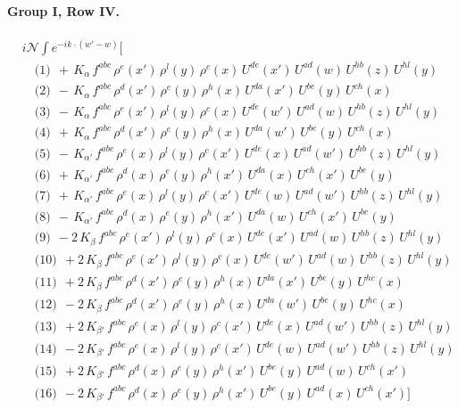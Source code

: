 \documentclass[10pt]{article}
\numberwithin{equation}{section}
\newcommand{\NN}{\mathcal N}
\begin{document}
\paragraph{Group I, Row IV.}
\begin{align*}
&i\NN\int e^{-ik\cdot(w'-w)}\Big[\\
&\quad\text{(1)}\ \ +\,K_{\alpha}\,f^{abc}\,\rho^{e}(x')\,\rho^{l}(y)\,\rho^{c}(x)\,U^{de}(x')\,U^{ad}(w)\,U^{hb}(z)\,U^{hl}(y)\\
&\quad\text{(2)}\ \ -\,K_{\alpha}\,f^{abc}\,\rho^{d}(x')\,\rho^{e}(y)\,\rho^{h}(x)\,U^{da}(x')\,U^{be}(y)\,U^{ch}(x)\\
&\quad\text{(3)}\ \ -\,K_{\alpha}\,f^{abc}\,\rho^{e}(x')\,\rho^{l}(y)\,\rho^{c}(x)\,U^{de}(w')\,U^{ad}(w)\,U^{hb}(z)\,U^{hl}(y)\\
&\quad\text{(4)}\ \ +\,K_{\alpha}\,f^{abc}\,\rho^{d}(x')\,\rho^{e}(y)\,\rho^{h}(x)\,U^{da}(w')\,U^{be}(y)\,U^{ch}(x)\\
&\quad\text{(5)}\ \ -\,K_{\alpha'}\,f^{abc}\,\rho^{e}(x)\,\rho^{l}(y)\,\rho^{c}(x')\,U^{de}(x)\,U^{ad}(w')\,U^{hb}(z)\,U^{hl}(y)\\
&\quad\text{(6)}\ \ +\,K_{\alpha'}\,f^{abc}\,\rho^{d}(x)\,\rho^{e}(y)\,\rho^{h}(x')\,U^{da}(x)\,U^{ch}(x')\,U^{be}(y)\\
&\quad\text{(7)}\ \ +\,K_{\alpha'}\,f^{abc}\,\rho^{e}(x)\,\rho^{l}(y)\,\rho^{c}(x')\,U^{de}(w)\,U^{ad}(w')\,U^{hb}(z)\,U^{hl}(y)\\
&\quad\text{(8)}\ \ -\,K_{\alpha'}\,f^{abc}\,\rho^{d}(x)\,\rho^{e}(y)\,\rho^{h}(x')\,U^{da}(w)\,U^{ch}(x')\,U^{be}(y)\\
&\quad\text{(9)}\ \ -2\,K_{\beta}\,f^{abc}\,\rho^{e}(x')\,\rho^{l}(y)\,\rho^{c}(x)\,U^{de}(x')\,U^{ad}(w)\,U^{hb}(z)\,U^{hl}(y)\\
&\quad\text{(10)}\ \ +2\,K_{\beta}\,f^{abc}\,\rho^{e}(x')\,\rho^{l}(y)\,\rho^{c}(x)\,U^{de}(w')\,U^{ad}(w)\,U^{hb}(z)\,U^{hl}(y)\\
&\quad\text{(11)}\ \ +2\,K_{\beta}\,f^{abc}\,\rho^{d}(x')\,\rho^{e}(y)\,\rho^{h}(x)\,U^{da}(x')\,U^{be}(y)\,U^{hc}(x)\\
&\quad\text{(12)}\ \ -2\,K_{\beta}\,f^{abc}\,\rho^{d}(x')\,\rho^{e}(y)\,\rho^{h}(x)\,U^{da}(w')\,U^{be}(y)\,U^{hc}(x)\\
&\quad\text{(13)}\ \ +2\,K_{\beta'}\,f^{abc}\,\rho^{e}(x)\,\rho^{l}(y)\,\rho^{c}(x')\,U^{de}(x)\,U^{ad}(w')\,U^{hb}(z)\,U^{hl}(y)\\
&\quad\text{(14)}\ \ -2\,K_{\beta'}\,f^{abc}\,\rho^{e}(x)\,\rho^{l}(y)\,\rho^{c}(x')\,U^{de}(w)\,U^{ad}(w')\,U^{hb}(z)\,U^{hl}(y)\\
&\quad\text{(15)}\ \ +2\,K_{\beta'}\,f^{abc}\,\rho^{d}(x)\,\rho^{e}(y)\,\rho^{h}(x')\,U^{be}(y)\,U^{ad}(w)\,U^{ch}(x')\\
&\quad\text{(16)}\ \ -2\,K_{\beta'}\,f^{abc}\,\rho^{d}(x)\,\rho^{e}(y)\,\rho^{h}(x')\,U^{be}(y)\,U^{ad}(x)\,U^{ch}(x')\Big]
\end{align*}
\end{document}
